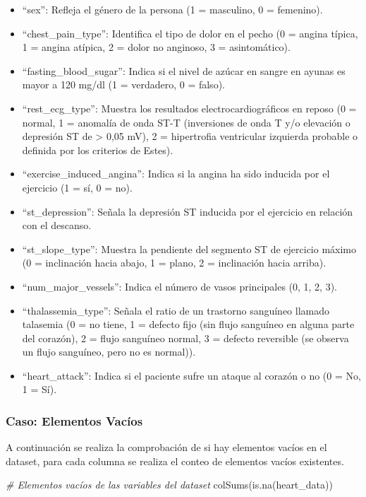 \documentclass[
]{article}
\newenvironment{Shaded}{\begin{snugshade}}{\end{snugshade}}
\newcommand{\CommentTok}[1]{\textcolor[rgb]{0.56,0.35,0.01}{\textit{#1}}}
\newcommand{\FunctionTok}[1]{\textcolor[rgb]{0.00,0.00,0.00}{#1}}
\newcommand{\NormalTok}[1]{#1}
\begin{document}
\begin{itemize}
\item
  ``sex'': Refleja el género de la persona (1 = masculino, 0 =
  femenino).
\item
  ``chest\_pain\_type'': Identifica el tipo de dolor en el pecho (0 =
  angina típica, 1 = angina atípica, 2 = dolor no anginoso, 3 =
  asintomático).
\item
  ``fasting\_blood\_sugar'': Indica si el nivel de azúcar en sangre en
  ayunas es mayor a 120 mg/dl (1 = verdadero, 0 = falso).
\item
  ``rest\_ecg\_type'': Muestra los resultados electrocardiográficos en
  reposo (0 = normal, 1 = anomalía de onda ST-T (inversiones de onda T
  y/o elevación o depresión ST de \textgreater{} 0,05 mV), 2 =
  hipertrofia ventricular izquierda probable o definida por los
  criterios de Estes).
\item
  ``exercise\_induced\_angina'': Indica si la angina ha sido inducida
  por el ejercicio (1 = sí, 0 = no).
\item
  ``st\_depression'': Señala la depresión ST inducida por el ejercicio
  en relación con el descanso.
\item
  ``st\_slope\_type'': Muestra la pendiente del segmento ST de ejercicio
  máximo (0 = inclinación hacia abajo, 1 = plano, 2 = inclinación hacia
  arriba).
\item
  ``num\_major\_vessels'': Indica el número de vasos principales (0, 1,
  2, 3).
\item
  ``thalassemia\_type'': Señala el ratio de un trastorno sanguíneo
  llamado talasemia (0 = no tiene, 1 = defecto fijo (sin flujo sanguíneo
  en alguna parte del corazón), 2 = flujo sanguíneo normal, 3 = defecto
  reversible (se observa un flujo sanguíneo, pero no es normal)).
\item
  ``heart\_attack'': Indica si el paciente sufre un ataque al corazón o
  no (0 = No, 1 = Sí).
\end{itemize}

\hypertarget{caso-elementos-vacuxedos}{%
\subsubsection{Caso: Elementos Vacíos}\label{caso-elementos-vacuxedos}}

A continuación se realiza la comprobación de si hay elementos vacíos en
el dataset, para cada columna se realiza el conteo de elementos vacíos
existentes.

\begin{Shaded}
\begin{Highlighting}[]
\CommentTok{\# Elementos vacíos de las variables del dataset}
\FunctionTok{colSums}\NormalTok{(}\FunctionTok{is.na}\NormalTok{(heart\_data))}
\end{Highlighting}
\end{Shaded}
\end{document}
